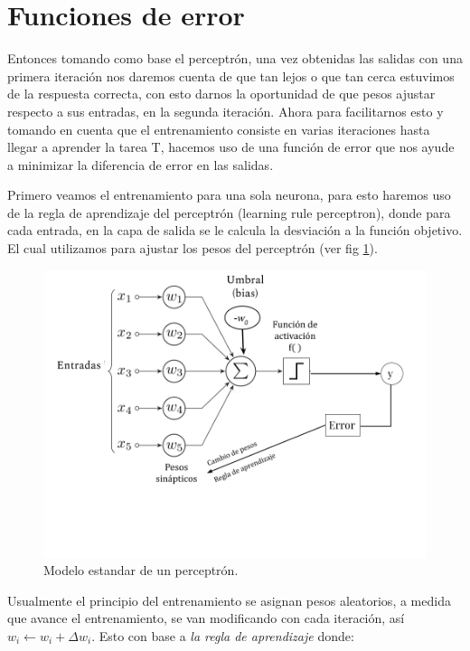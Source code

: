 \section{Funciones de error}

Entonces tomando como base el perceptrón, una vez obtenidas las salidas con una primera iteración nos daremos cuenta de que tan lejos o que tan cerca estuvimos de la respuesta correcta, con esto darnos la oportunidad de que pesos ajustar respecto a sus entradas, en la segunda iteración. Ahora para facilitarnos esto y tomando en cuenta que el entrenamiento consiste en varias iteraciones hasta llegar a aprender la tarea T, hacemos uso de una función de error que nos ayude a minimizar la diferencia de error en las salidas. 

Primero veamos el entrenamiento para una sola neurona, para esto haremos uso de la regla de aprendizaje del perceptrón (learning rule perceptron), donde para cada entrada, en la capa de salida se le calcula la desviación a la función objetivo. El cual utilizamos para ajustar los pesos del perceptrón (ver fig \ref{fig:errorP}). 

\begin{figure}[h]
 \centering
 \includegraphics[scale=0.5]{../Figuras/ErrorPerceptron.png}
 \caption{Modelo estandar de un perceptrón.}
 \label{fig:errorP}
\end{figure}

Usualmente el principio del entrenamiento se asignan pesos aleatorios, a medida que avance el entrenamiento, se van modificando con cada iteración, así \(w_{i} \leftarrow w_{i} + \Delta w_{i}\). Esto con base a \emph{la regla de aprendizaje} donde: 

